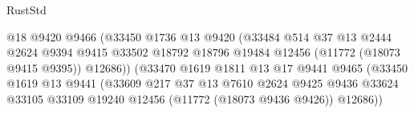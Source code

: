 \begin{lexlean}{RustStd}
\begin{coremodule}
                                            @18
                                            @9420
                                            @9466
                                            (@33450
                                              @1736
                                              @13
                                              @9420
                                              (@33484
                                                @514
                                                @37
                                                @13
                                                @2444
                                                @2624
                                                @9394
                                                @9415
                                                @33502
                                                @18792
                                                @18796
                                                @19484
                                                @12456
                                                (@11772 (@18073 @9415 @9395))
                                                @12686))
                                            (@33470
                                              @1619
                                              @1811
                                              @13
                                              @17
                                              @9441
                                              @9465
                                              (@33450
                                                @1619
                                                @13
                                                @9441
                                                (@33609
                                                  @217
                                                  @37
                                                  @13
                                                  @7610
                                                  @2624
                                                  @9425
                                                  @9436
                                                  @33624
                                                  @33105
                                                  @33109
                                                  @19240
                                                  @12456
                                                  (@11772 (@18073 @9436 @9426))
                                                  @12686))

\end{coremodule}
\end{lexlean}
